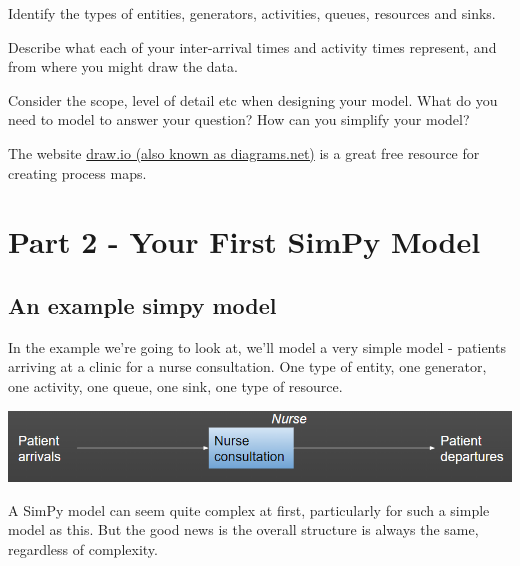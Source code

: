 \documentclass[
  letterpaper,
  DIV=11,
  numbers=noendperiod]{scrreprt}
\begin{document}
Identify the types of entities, generators, activities, queues,
resources and sinks.

Describe what each of your inter-arrival times and activity times
represent, and from where you might draw the data.

Consider the scope, level of detail etc when designing your model. What
do you need to model to answer your question? How can you simplify your
model?

\begin{tcolorbox}[enhanced jigsaw, rightrule=.15mm, colback=white, colframe=quarto-callout-tip-color-frame, colbacktitle=quarto-callout-tip-color!10!white, toprule=.15mm, coltitle=black, opacityback=0, titlerule=0mm, bottomtitle=1mm, breakable, title=\textcolor{quarto-callout-tip-color}{\faLightbulb}\hspace{0.5em}{Tip}, opacitybacktitle=0.6, toptitle=1mm, arc=.35mm, bottomrule=.15mm, leftrule=.75mm, left=2mm]

The website \href{https://app.diagrams.net/}{draw.io (also known as
diagrams.net)} is a great free resource for creating process maps.

\end{tcolorbox}

\part{Part 2 - Your First SimPy Model}

\chapter{An example simpy model}\label{an-example-simpy-model}

In the example we're going to look at, we'll model a very simple model -
patients arriving at a clinic for a nurse consultation. One type of
entity, one generator, one activity, one queue, one sink, one type of
resource.

\includegraphics{images/example_simplest_model.png}

A SimPy model can seem quite complex at first, particularly for such a
simple model as this. But the good news is the overall structure is
always the same, regardless of complexity.
\end{document}
